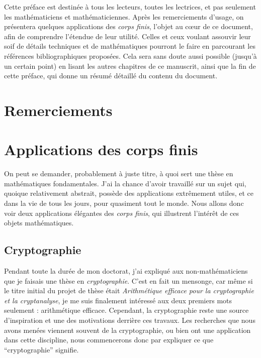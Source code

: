 Cette préface est destinée à tous les lecteurs, toutes les lectrices, et pas
seulement les mathématiciens et mathématiciennes. Après les remerciements
d'usage, on présentera quelques applications des \emph{corps finis}, l'objet au
cœur de ce document, afin de comprendre l'étendue de leur utilité. Celles et ceux
voulant assouvir leur soif de détails techniques et de mathématiques
pourront le faire en parcourant les références bibliographiques proposées. Cela
sera sans doute aussi possible (jusqu'à un certain point) en lisant les autres
chapitres de ce manuscrit, ainsi que la fin de cette préface, qui donne un
résumé détaillé du contenu du document.

\minitoc
%
\clearpage

\section*{Remerciements}

\clearpage
\section*{Applications des corps finis}

On peut se demander, probablement à juste titre, à quoi sert une thèse en
mathématiques fondamentales. J'ai la chance d'avoir travaillé sur un sujet qui,
quoique relativement abstrait, possède des applications extrêmement utiles, et
ce dans la vie de tous les jours, pour quasiment tout le monde. Nous allons donc
voir deux applications élégantes des \emph{corps finis}, qui illustrent
l'intérêt de ces objets mathématiques.

\subsection*{Cryptographie}
\label{sec:crypto}

Pendant toute la durée de mon doctorat, j'ai expliqué aux non-mathématiciens que
je faisais une thèse en \emph{cryptographie}. C'est en fait un mensonge, car
même si le titre initial du projet de thèse était \emph{Arithmétique efficace
pour la cryptographie et la cryptanalyse}, je me suis finalement intéressé
aux deux premiers mots seulement : arithmétique efficace. Cependant, la
cryptographie reste une source d'inspiration et une des motivations derrière ces
travaux. Les recherches que nous avons menées viennent souvent de la
cryptographie, ou bien ont une application dans cette discipline, nous
commencerons donc par expliquer ce que ``cryptographie'' signifie.

